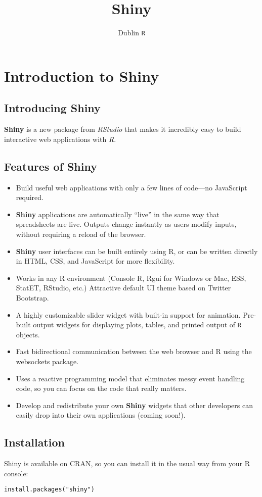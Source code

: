 \documentclass[]{article}
\title{Shiny}
\author{Dublin \texttt{R}}
\begin{document}
\maketitle

\section{Introduction to Shiny}

\subsection{Introducing Shiny}
\textbf{Shiny} is a new package from \textit{RStudio} that makes it incredibly easy to build interactive web applications with \textit{R}.


\subsection{Features of Shiny}
\begin{itemize}
\item Build useful web applications with only a few lines of code—no JavaScript required.
\item \textbf{Shiny} applications are automatically “live” in the same way that spreadsheets are live. Outputs change instantly as users modify inputs, without requiring a reload of the browser.
\item \textbf{Shiny} user interfaces can be built entirely using R, or can be written directly in HTML, CSS, and JavaScript for more flexibility.
\item Works in any R environment (Console R, Rgui for Windows or Mac, ESS, StatET, RStudio, etc.)
Attractive default UI theme based on Twitter Bootstrap.
\item A highly customizable slider widget with built-in support for animation.
Pre-built output widgets for displaying plots, tables, and printed output of \texttt{R} objects.
\item Fast bidirectional communication between the web browser and R using the websockets package.
\item Uses a reactive programming model that eliminates messy event handling code, so you can focus on the code that really matters.
\item Develop and redistribute your own \textbf{Shiny} widgets that other developers can easily drop into their own applications (coming soon!).
\end{itemize}
\subsection{Installation}
Shiny is available on CRAN, so you can install it in the usual way from your R console:
\begin{framed}
\begin{verbatim}
install.packages("shiny")
\end{verbatim}
\end{framed}
\end{document}

